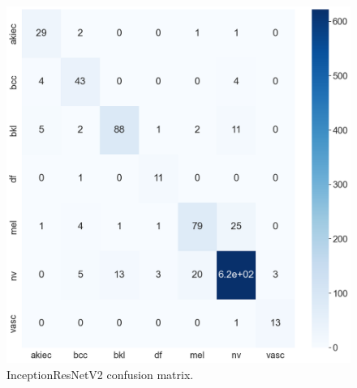 \documentclass[sensors,article,accept,pdftex,moreauthors]{Definitions/mdpi}
\begin{document}
		\begin{figure}[H]
		\begin{minipage}{0.48\textwidth}
\centering
\includegraphics[width=1.3\linewidth]{Definitions/CM/irv2cm}
		\end{minipage}
\caption{{InceptionResNetV2} %
 confusion matrix.}\label{fig:irv2cm}
	\end{figure}
	
\end{document}
